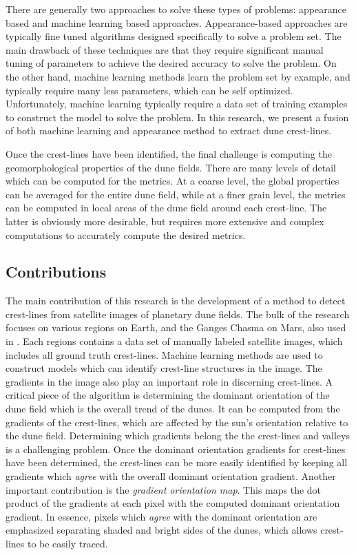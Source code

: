 There are generally two approaches to solve these types of problems: appearance based and machine learning based approaches. Appearance-based approaches are typically fine tuned algorithms designed specifically to solve a problem set. The main drawback of these techniques are that they require significant manual tuning of parameters to achieve the desired accuracy to solve the problem. On the other hand, machine learning methods learn the problem set by example, and typically require many less parameters, which can be self optimized. Unfortunately, machine learning typically require a data set of training examples to construct the model to solve the problem. In this research, we present a fusion of both machine learning and appearance method to extract dune crest-lines.

Once the crest-lines have been identified, the final challenge is computing the geomorphological properties of the dune fields. There are many levels of detail which can be computed for the metrics. At a coarse level, the global properties can be averaged for the entire dune field, while at a finer grain level, the metrics can be computed in local areas of the dune field around each crest-line. The latter is obviously more desirable, but requires more extensive and complex computations to accurately compute the desired metrics.

\subsection{Contributions}

The main contribution of this research is the development of a method to detect crest-lines from satellite images of planetary dune fields. The bulk of the research focuses on various regions on Earth, and the Ganges Chasma on Mars, also used in \cite{vaz_object_based_dune_analysis}. Each regions contains a data set of manually labeled satellite images, which includes all ground truth crest-lines. Machine learning methods are used to construct models which can identify crest-line structures in the image. The gradients in the image also play an important role in discerning crest-lines. A critical piece of the algorithm is determining the dominant orientation of the dune field which is the overall trend of the dunes. It can be computed from the gradients of the crest-lines, which are affected by the sun's orientation relative to the dune field. Determining which gradients belong the the crest-lines and valleys is a challenging problem. Once the dominant orientation gradients for crest-lines have been determined, the crest-lines can be more easily identified by keeping all gradients which \emph{agree} with the overall dominant orientation gradient. Another important contribution is the \emph{gradient orientation map}. This maps the dot product of the gradients at each pixel with the computed dominant orientation gradient. In essence, pixels which \emph{agree} with the dominant orientation are emphasized separating shaded and bright sides of the dunes, which allows crest-lines to be easily traced.

